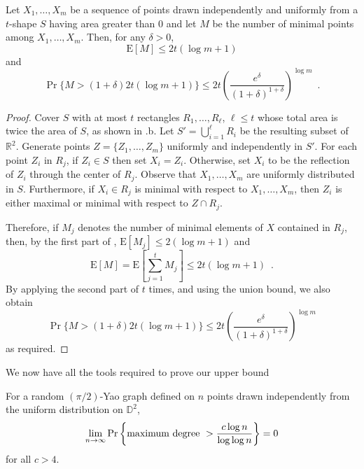 \documentclass[lotsofwhite,charterfonts]{patmorin}
\newcommand{\RR}{\mathbb{R}}
\newcommand{\D}{\mathbb{D}}
\newcommand{\PROB}{\Pr}
\newcommand{\EXP}{\mathrm{E}}
\begin{document}
\begin{lem}
  Let $X_1,\ldots,X_m$ be a sequence of points drawn independently and
  uniformly from a $t$-shape $S$ having area greater than
  0 and let $M$ be the number of minimal points
  among $X_1,\ldots,X_m$.  Then, for any $\delta >0$,
  \begin{equation}
    \EXP[M] \le 2t(\log m + 1)
  \end{equation}
  and 
  \begin{equation}
    \PROB\{M>(1+\delta)2t(\log m+1)\} 
        \le 2t\left(\frac{e^\delta}{(1+\delta)^{1+\delta}}\right)^{\log m} 
	\enspace .
  \end{equation}
\end{lem}

\begin{proof}
Cover $S$ with at most $t$ rectangles $R_1,\ldots,R_\ell$, $\ell\le t$
whose total area is twice the area of $S$, as shown in .b.
Let $S'=\bigcup_{i=1}^\ell R_i$ be the resulting subset of $\RR^2$.
Generate points $Z=\{Z_1,\ldots,Z_m\}$ uniformly and independently in
$S'$.  For each point $Z_i$ in $R_j$, if $Z_i\in S$ then set $X_i=Z_i$.
Otherwise, set $X_i$ to be the reflection of $Z_i$ through the center
of $R_j$.  Observe that $X_1,\ldots,X_m$ are uniformly distributed in $S$.
Furthermore, if $X_i\in R_j$ is minimal with respect to $X_1,\ldots,X_m$,
then $Z_i$ is either maximal or minimal with respect to $Z \cap R_j$.

Therefore, if $M_j$ denotes the number of minimal elements of $X$ contained
in $R_j$, then, by the first part of , $\EXP[M_j]\le
2(\log m+1)$ and 
\[
     \EXP[M] = \EXP\left[\sum_{j=1}^t M_j\right] \le 2t(\log m + 1)
     \enspace .
\]
By applying the second part of  $t$ times,
and using the union bound, we also obtain
\[
    \PROB\{M>(1+\delta)2t(\log m+1)\} 
        \le 2t\left(\frac{e^\delta}{(1+\delta)^{1+\delta}}\right)^{\log m} 
\]
as required.
\end{proof}

We now have all the tools required to prove our upper bound

\begin{thm}
For a random $(\pi/2)$-Yao graph defined on $n$ points drawn
independently from the uniform distribution on
$\D^2$, 
\[
\lim_{n\to\infty} \PROB \left\{ \hbox{\rm maximum degree}~> {c \log n \over
\log \log n} \right\} = 0
\]
for all $c > 4$.
\end{thm}
\end{document}

